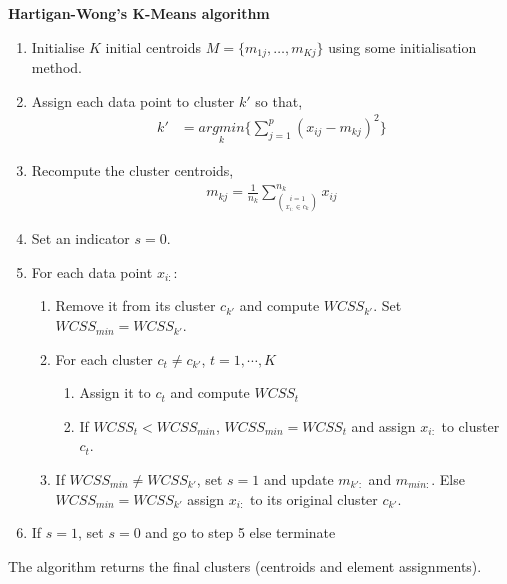 \documentclass[12pt]{article}
\begin{document}
\cleardoublepage


\begin{center}
	\setlength\abovedisplayskip{0pt}
	\begin{tcolorbox}[breakable,colback=white!100!white,colframe=black!100!black]
		\noindent\textbf{Hartigan-Wong's K-Means algorithm}
		\begin{enumerate}
			\item Initialise $K$ initial centroids $M = \{m_{1j}, \dots, m_{Kj}\}$ using some initialisation method. 
			
			\item Assign each data point to cluster $k'$ so that,
			\begin{align}\nonumber
			k' &= \underset{k}{argmin}\bigg\{ \sum_{j=1}^{p} (x_{ij}-m_{kj})^2    \bigg\}
			\end{align}	
			
			\item Recompute the cluster centroids,
			\begin{align}\nonumber
				m_{kj} = \frac{1}{n_k}\sum_{\binom{i=1}{x_{i:} \in c_k}}^{n_k} x_{ij}
			\end{align}	
			
			\item Set an indicator $s=0$.		
			
			\item For each data point $x_{i:}$:
			
			\begin{enumerate}
				\item Remove it from its cluster $c_{k'}$ and compute $WCSS_{k'}$. Set $ WCSS_{min} = WCSS_{k'}$.
				\item For each cluster $c_{t} \neq c_{k'}$, $t = 1,\cdots, K$
				\begin{enumerate}
					\item Assign it to $c_{t}$ and compute $WCSS_{t}$
					\item If $WCSS_{t} < WCSS_{min}$, $WCSS_{min}=WCSS_{t}$ and assign $x_{i:}$ to cluster $c_{t}$.
				\end{enumerate}
				\item If $WCSS_{min} \neq WCSS_{k'}$, set $s=1$ and update $m_{k':}$ and $m_{min:}$. Else $WCSS_{min} = WCSS_{k'}$ assign $x_{i:}$ to its original cluster $c_{k'}$. 
			\end{enumerate}	
			
			\item If $s=1$, set $s=0$ and go to step 5 else terminate
			
		\end{enumerate}	
		The algorithm returns the final clusters (centroids and element assignments).
	\end{tcolorbox}
\end{center}
\end{document}
